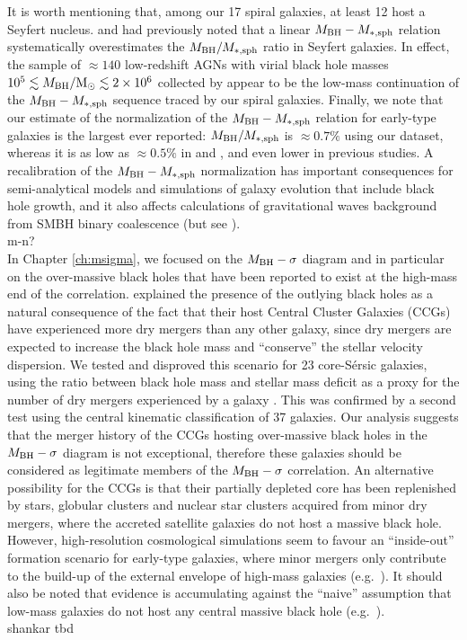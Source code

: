 It is worth mentioning that, among our 17 spiral galaxies, at least 12 host a Seyfert nucleus. 
\citet{wandel1999} and \citet{ryan2007} had previously noted that a linear $M_{\rm BH} - M_{\rm *,sph}$ relation 
systematically overestimates the $M_{\rm BH}/M_{\rm *,sph}$ ratio in Seyfert galaxies. 
In effect, the sample of $\approx 140$ low-redshift AGNs with virial black hole masses 
$10^5 \lesssim M_{\rm BH}/{\rm M_\odot} \lesssim 2 \times 10^6$ collected by \citet{grahamscott2015} 
appear to be the low-mass continuation of the $M_{\rm BH} - M_{\rm *,sph}$ sequence traced by our spiral galaxies. 
Finally, we note that our estimate of the normalization of the $M_{\rm BH} - M_{\rm *,sph}$ relation for early-type galaxies 
is the largest ever reported: $M_{\rm BH}/M_{\rm *,sph}$ is $\approx 0.7\%$ using our dataset, 
whereas it is as low as $\approx 0.5\%$ in \citet{scott2013} and \citet{kormendyho2013}, 
and even lower in previous studies. 
A recalibration of the $M_{\rm BH} - M_{\rm *,sph}$ normalization has important consequences 
for semi-analytical models and simulations of galaxy evolution that include black hole growth, 
and it also affects calculations of gravitational waves background from SMBH binary coalescence 
(but see \citealt{shankar2016}). \\

m-n? \\

In Chapter \ref{ch:msigma}, we focused on the $M_{\rm BH} - \sigma$ diagram 
and in particular on the over-massive black holes that have been reported to exist 
at the high-mass end of the correlation. 
\citet{volontericiotti2013} explained the presence of the outlying black holes 
as a natural consequence of the fact that their host Central Cluster Galaxies (CCGs) have experienced more dry mergers 
than any other galaxy, 
since dry mergers are expected to increase the black hole mass 
and ``conserve'' the stellar velocity dispersion. 
We tested and disproved this scenario for 23 core-S\'ersic galaxies, 
using the ratio between black hole mass and stellar mass deficit as a proxy 
for the number of dry mergers experienced by a galaxy \citep{merritt2006}. 
This was confirmed by a second test using the central kinematic classification of 37 galaxies. 
Our analysis suggests that 
the merger history of the CCGs hosting over-massive black holes in the $M_{\rm BH} - \sigma$ diagram 
is not exceptional, 
therefore these galaxies should be considered as legitimate members of the $M_{\rm BH} - \sigma$ correlation. 
An alternative possibility for the CCGs is that their partially depleted core 
has been replenished by stars, globular clusters and nuclear star clusters 
acquired from minor dry mergers, 
where the accreted satellite galaxies do not host a massive black hole. 
However, high-resolution cosmological simulations seem to favour an ``inside-out'' formation scenario 
for early-type galaxies, 
where minor mergers only contribute to the build-up of the external envelope of high-mass galaxies 
(e.g.~\citealt{wellons2016}). 
It should also be noted that evidence is accumulating against the ``naive'' assumption 
that low-mass galaxies do not host any central massive black hole 
(e.g.~\citealt{Baldassare2015,Graham2016LEDA}). \\
shankar tbd

